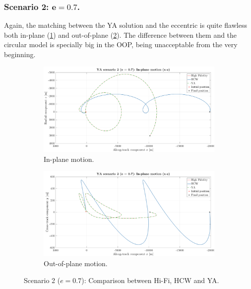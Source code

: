 		\subsubsection{Scenario 2: $\bm{e = 0.7}$.}
		\indent Again, the matching between the YA solution and the eccentric is quite flawless both in-plane (\ref{figCh3:Scenario2_IP}) and out-of-plane (\ref{figCh3:Scenario2_OOP}). The difference between them and the circular model is specially big in the OOP, being unacceptable from the very beginning.
		\clearpage
		\begin{figure}[ht]
		\begin{changemargin}{-2.2cm}{-1cm}
		\begin{adjustbox}{width=1.18\textwidth}
		\centering
		\medskip
		\begin{subfigure}[t]{\linewidth}
		\centering\includegraphics[width=\linewidth]{Chapters/Chapter_03/Low_quality/YA_scenario_2_(e___0_7)_IP}
		\caption{In-plane motion.}
		\label{figCh3:Scenario2_IP}
		\end{subfigure}
		\end{adjustbox}
		\end{changemargin}
		\begin{changemargin}{-2.2cm}{-1cm}
		\begin{adjustbox}{width=1.18\textwidth}
		\begin{subfigure}[t]{\linewidth}
		\centering\includegraphics[width=\linewidth]{Chapters/Chapter_03/Low_quality/YA_scenario_2_(e___0_7)_OOP}
		\caption{Out-of-plane motion.}
		\label{figCh3:Scenario2_OOP}
		\end{subfigure}
		\end{adjustbox}
		\end{changemargin}
		\caption{Scenario 2 ($e= 0.7$): Comparison between Hi-Fi, HCW and YA. }
		\label{figCh3:Scenario2}
		\end{figure}
